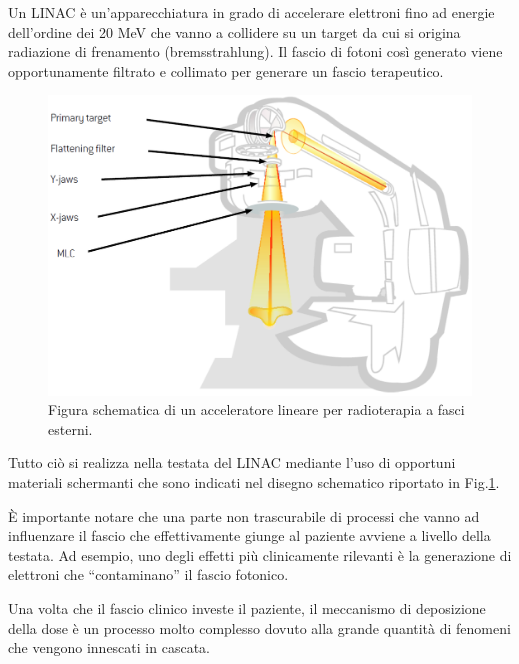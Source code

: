 Un LINAC è un'apparecchiatura in grado di accelerare elettroni fino ad energie dell'ordine dei 20 MeV che vanno a collidere su un target da cui si origina radiazione di frenamento (bremsstrahlung). Il fascio di fotoni così generato viene opportunamente filtrato e collimato per generare un fascio terapeutico. 
\begin{figure}
\centering
\includegraphics[width=.7\textwidth]{./cap1/linac.png}
\caption{Figura schematica di un acceleratore lineare per radioterapia a fasci esterni.}
\label{fig:linac}
\end{figure}
Tutto ciò si realizza nella testata del LINAC mediante l'uso di opportuni materiali schermanti che sono indicati nel disegno schematico riportato in Fig.\ref{fig:linac}.

 \`{E} importante notare che una parte non trascurabile di processi che vanno ad influenzare il fascio che effettivamente giunge al paziente avviene a livello della testata. Ad esempio, uno degli effetti più clinicamente rilevanti è la generazione di elettroni che \textquotedblleft contaminano\textquotedblright{} il fascio fotonico.

Una volta che il fascio clinico investe il paziente, il meccanismo di deposizione della dose è un processo molto complesso dovuto alla grande quantità di fenomeni che vengono innescati in cascata.

